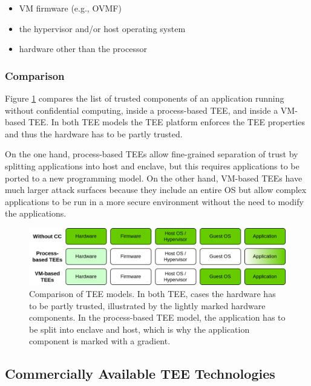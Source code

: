 \begin{itemize}
  \item VM firmware (e.g., OVMF)
  \item the hypervisor and/or host operating system
  \item hardware other than the processor
\end{itemize}

\subsubsection{Comparison}

Figure \ref{figure:cc-tee-comparison} compares the list of trusted components of
an application running without confidential computing, inside a process-based
TEE, and inside a VM-based TEE. In both TEE models the TEE platform enforces the
TEE properties and thus the hardware has to be partly trusted. 

On the one hand, process-based TEEs allow fine-grained separation of trust by
splitting applications into host and enclave, but this requires applications to
be ported to a new programming model. On the other hand, VM-based TEEs have much
larger attack surfaces because they include an entire OS but allow complex
applications to be run in a more secure environment without the need to modify
the applications.

\begin{figure}[H]
  \centering
  \includegraphics[width=0.85\linewidth]{resources/tee-models-comparison.drawio.png}
  \caption[Comparison of TEE models.]{
    Comparison of TEE models. In both TEE, cases the hardware has to be partly
    trusted, illustrated by the lightly marked hardware components. In the
    process-based TEE model, the application has to be split into enclave and
    host, which is why the application component is marked with a gradient.
  }
  \label{figure:cc-tee-comparison}
\end{figure}

\subsection{Commercially Available TEE Technologies}
\label{sec:commercial-tee-technologies}

